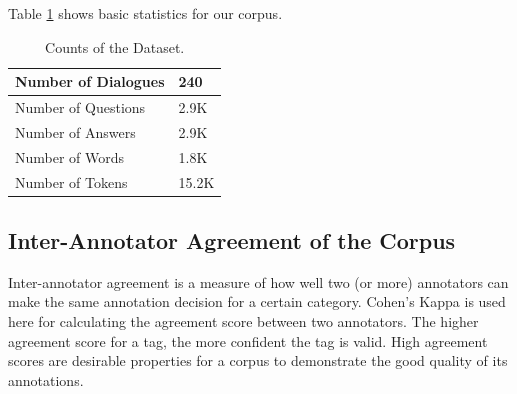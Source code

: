 \documentclass[bsc,frontabs,twoside,singlespacing,parskip,deptreport]{infthesis}     %
\begin{document}
Table \ref{tab:datacount} shows basic statistics for our corpus.

\begin{table}[]
\centering
\begin{tabular}{|l|l|}
\hline
Number of Dialogues & 240   \\ \hline
Number of Questions & 2.9K  \\ \hline
Number of Answers   & 2.9K  \\ \hline
Number of Words     & 1.8K  \\ \hline
Number of Tokens    & 15.2K \\ \hline
\end{tabular}
\caption{Counts of the Dataset.}
\label{tab:datacount}
\end{table}




\subsection*{Inter-Annotator Agreement of the Corpus}

Inter-annotator agreement is a measure of how well two (or more) annotators can make the same annotation decision for a certain category. Cohen's Kappa is used here for calculating the agreement score between two annotators. The higher agreement score for a tag, the more confident the tag is valid. High agreement scores are desirable properties for a corpus to demonstrate the good quality of its annotations. 
\end{document}

